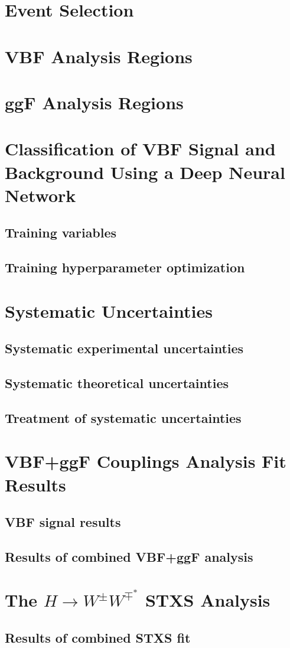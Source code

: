\section{Event Selection}
\section{VBF Analysis Regions}
\section{ggF Analysis Regions}

\section{Classification of VBF Signal and Background Using a Deep Neural Network}
\subsection{Training variables}
\subsection{Training hyperparameter optimization}

\section{Systematic Uncertainties}
\subsection{Systematic experimental uncertainties}
\subsection{Systematic theoretical uncertainties}
\subsection{Treatment of systematic uncertainties}

\section{\HWW VBF+ggF Couplings Analysis Fit Results}
\subsection{VBF signal results}
\subsection{Results of combined VBF+ggF analysis}

\section{The $H\rightarrow W^{\pm}W^{\mp^*}$ STXS Analysis}
\subsection{Results of combined STXS fit}
